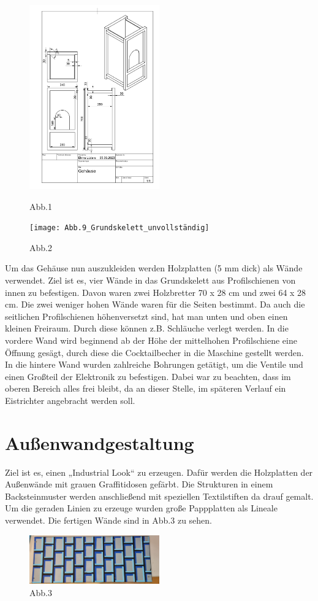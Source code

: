 \documentclass[10pt,a4paper]{report}
\begin{document}
\begin{figure}[htb]
	\includegraphics[width=0.5\textwidth]{Abb.8 Grundaufbau_Skizze.pdf}\\
	\centering
	\caption{Abb.1}
\end{figure}
\newpage
\begin{figure}[htb]
	\texttt{[image: Abb.9\_Grundskelett\_unvollständig]}
	\centering
	\caption{Abb.2}
\end{figure}
	Um das Gehäuse nun auszukleiden werden Holzplatten (5 mm dick) als Wände verwendet. Ziel ist es, vier Wände in das Grundskelett aus Profilschienen von innen zu befestigen. Davon waren zwei Holzbretter 70 x 28 cm und zwei 64 x 28 cm. Die zwei weniger hohen Wände waren für die Seiten bestimmt. Da auch die seitlichen Profilschienen höhenversetzt sind, hat man unten und oben einen kleinen Freiraum. Durch diese können z.B. Schläuche verlegt werden. In die vordere Wand wird beginnend ab der Höhe der mittelhohen Profilschiene eine Öffnung gesägt, durch diese die Cocktailbecher in die Maschine gestellt werden. In die hintere Wand wurden zahlreiche Bohrungen getätigt, um die Ventile und einen Großteil der Elektronik zu befestigen. Dabei war zu beachten, dass im oberen Bereich alles frei bleibt, da an dieser Stelle, im späteren Verlauf ein Eistrichter angebracht werden soll. 
	
	\section{Außenwandgestaltung}	
	Ziel ist es, einen „Industrial Look“ zu erzeugen. Dafür werden die Holzplatten der Außenwände mit grauen Graffitidosen gefärbt. Die Strukturen in einem Backsteinmuster werden anschließend mit speziellen Textilstiften da drauf gemalt. Um die geraden Linien zu erzeuge wurden große Pappplatten als Lineale verwendet. Die fertigen Wände sind in Abb.3 zu sehen.
	\begin{figure}[htb]
		\includegraphics[width=0.5\textwidth]{Abb.16_bemalte_Holzwand.jpg}
		\centering
		\caption{Abb.3}
	\end{figure}	
	\newpage
\end{document}
